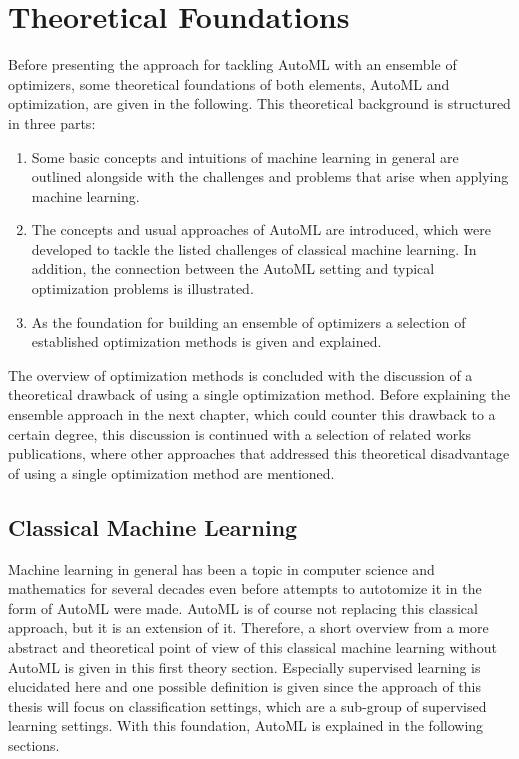 %
\chapter{Theoretical Foundations}
\label{sec:theory}
Before presenting the approach for tackling AutoML with an ensemble of optimizers, some theoretical foundations of both elements, AutoML and optimization, are given in the following.
This theoretical background is structured in three parts:
\begin{enumerate}
    \item Some basic concepts and intuitions of machine learning in general are outlined alongside with the challenges and problems that arise when applying machine learning.
    \item The concepts and usual approaches of AutoML are introduced, which were developed to tackle the listed challenges of classical machine learning. In addition, the connection between the AutoML setting and typical optimization problems is illustrated.
    \item As the foundation for building an ensemble of optimizers a selection of established optimization methods is given and explained.
\end{enumerate}
The overview of optimization methods is concluded with the discussion of a theoretical drawback of using a single optimization method.
Before explaining the ensemble approach in the next chapter, which could counter this drawback to a certain degree, this discussion is continued with a selection of related works publications, where other approaches that addressed this theoretical disadvantage of using a single optimization method are mentioned. 

\section{Classical Machine Learning}
\label{sec:theory:ml}
Machine learning in general has been a topic in computer science and mathematics for several decades even before attempts to autotomize it  in the form of AutoML were made.
AutoML is of course not replacing this classical approach, but it is an extension of it.
Therefore, a short overview from a more abstract and theoretical point of view of this classical machine learning without AutoML is given in this first theory section.
Especially supervised learning is elucidated here and one possible definition is given since the approach of this thesis will focus on classification settings, which are a sub-group of supervised learning settings.
With this foundation, AutoML is explained in the following sections.

